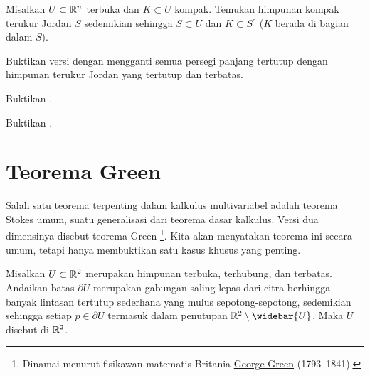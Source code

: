 \begin{exercise}
Misalkan $U \subset {\mathbb{R}}^n$ terbuka dan $K \subset U$ kompak.
Temukan himpunan kompak terukur Jordan $S$ sedemikian sehingga $S \subset U$
dan $K \subset S^\circ$ ($K$ berada di bagian dalam $S$).
\end{exercise}

\begin{exercise} \label{exercise:closednessofriemannintegrable}
Buktikan versi  dengan mengganti semua
persegi panjang tertutup dengan himpunan terukur Jordan yang tertutup dan terbatas.
\end{exercise}

\begin{exercise}
Buktikan .
\end{exercise}

\begin{exercise}
Buktikan .
\end{exercise}


\sectionnewpage
\section{Teorema Green}
\label{sec:mvgreenstheorem}


Salah satu teorema terpenting dalam kalkulus multivariabel
adalah teorema Stokes umum,
suatu generalisasi dari teorema dasar kalkulus.
Versi dua dimensinya
disebut teorema Green%
\footnote{Dinamai menurut fisikawan matematis Britania
\href{https://en.wikipedia.org/wiki/George_Green_(mathematician)}{George Green}
(1793--1841).}.  Kita akan menyatakan teorema ini secara umum, tetapi
hanya membuktikan satu kasus khusus yang penting.

\begin{defn}
Misalkan $U \subset {\mathbb{R}}^2$ merupakan himpunan terbuka, terhubung, dan terbatas.
Andaikan batas
$\partial U$ merupakan gabungan saling lepas dari citra berhingga banyak
lintasan tertutup sederhana yang mulus sepotong-sepotong, sedemikian sehingga
setiap $p \in \partial U$ termasuk dalam penutupan
$\R^2 \setminus \widebar{U}$.
Maka $U$ disebut
\emph{}%
di ${\mathbb{R}}^2$.
\end{defn}

